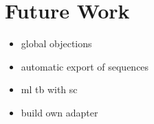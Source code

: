 \section{Future Work}\label{future_work}
\begin{itemize}
  \item global objections
  \item automatic export of sequences
  \item ml tb with sc
  \item build own adapter
\end{itemize}